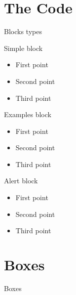\documentclass{if-beamer}
\begin{document}
\section{The Code}
\begin{frame}{Blocks types}

\begin{block}{Simple block}
\begin{itemize}
  \item First point
  \item Second point
  \item Third point
\end{itemize}
\end{block}

\begin{exampleblock}{Examples block}
\begin{itemize}
  \item First point
  \item Second point
  \item Third point
\end{itemize}
\end{exampleblock}

\begin{alertblock}{Alert block}
\begin{itemize}
  \item First point
  \item Second point
  \item Third point
\end{itemize}
\end{alertblock}
\end{frame}

\section{Boxes}

\begin{frame}{Boxes}









\end{frame}
\end{document}
